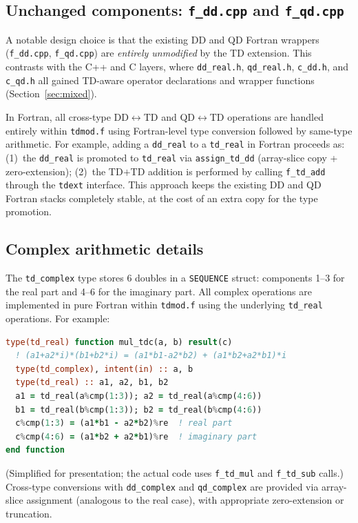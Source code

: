 \documentclass[11pt,a4paper]{article}
\begin{document}
\subsection{Unchanged components: \texttt{f\_dd.cpp} and
\texttt{f\_qd.cpp}}

A notable design choice is that the existing DD and QD Fortran
wrappers (\texttt{f\_dd.cpp}, \texttt{f\_qd.cpp}) are
\emph{entirely unmodified} by the TD extension.  This contrasts
with the C++ and C layers, where \texttt{dd\_real.h},
\texttt{qd\_real.h}, \texttt{c\_dd.h}, and \texttt{c\_qd.h} all
gained TD-aware operator declarations and wrapper functions
(Section~\ref{sec:mixed}).

In Fortran, all cross-type DD$\leftrightarrow$TD and
QD$\leftrightarrow$TD operations are handled entirely within
\texttt{tdmod.f} using Fortran-level type conversion followed by
same-type arithmetic.  For example, adding a \texttt{dd\_real} to
a \texttt{td\_real} in Fortran proceeds as:
(1)~the \texttt{dd\_real} is promoted to \texttt{td\_real} via
\texttt{assign\_td\_dd} (array-slice copy + zero-extension);
(2)~the TD$+$TD addition is performed by calling
\texttt{f\_td\_add} through the \texttt{tdext} interface.
This approach keeps the existing DD and QD Fortran stacks
completely stable, at the cost of an extra copy for the type
promotion.

\subsection{Complex arithmetic details}

The \texttt{td\_complex} type stores 6 doubles in a
\texttt{SEQUENCE} struct: components 1--3 for the real part and
4--6 for the imaginary part.  All complex operations are
implemented in pure Fortran within \texttt{tdmod.f} using the
underlying \texttt{td\_real} operations.  For example:

\begin{lstlisting}[language=Fortran]
type(td_real) function mul_tdc(a, b) result(c)
  ! (a1+a2*i)*(b1+b2*i) = (a1*b1-a2*b2) + (a1*b2+a2*b1)*i
  type(td_complex), intent(in) :: a, b
  type(td_real) :: a1, a2, b1, b2
  a1 = td_real(a%cmp(1:3)); a2 = td_real(a%cmp(4:6))
  b1 = td_real(b%cmp(1:3)); b2 = td_real(b%cmp(4:6))
  c%cmp(1:3) = (a1*b1 - a2*b2)%re  ! real part
  c%cmp(4:6) = (a1*b2 + a2*b1)%re  ! imaginary part
end function
\end{lstlisting}
(Simplified for presentation; the actual code uses \texttt{f\_td\_mul}
and \texttt{f\_td\_sub} calls.)  Cross-type conversions with
\texttt{dd\_complex} and \texttt{qd\_complex} are provided via
array-slice assignment (analogous to the real case), with
appropriate zero-extension or truncation.
\end{document}
